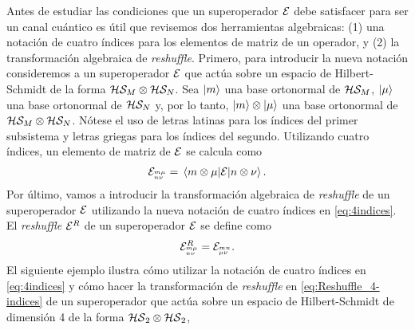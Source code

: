 Antes de estudiar las condiciones que un superoperador $\mathcal{E}$
debe satisfacer para ser un canal cuántico es útil que revisemos
dos herramientas algebraicas: (1) una notación de cuatro índices 
para los elementos de matriz de un operador, y (2) la transformación 
algebraica de \textit{reshuffle}. Primero, para introducir la nueva notación
consideremos a un superoperador $\mathcal{E}$ que actúa sobre un espacio de 
Hilbert-Schmidt de la forma $\mathcal{H}\mathcal{S}_M\otimes\mathcal{H}\mathcal{S}_N$. 
Sea $\ket{m}$ una base ortonormal de $\mathcal{H}\mathcal{S}_M$, $\ket{\mu}$ 
una base ortonormal de $\mathcal{H}\mathcal{S}_N$ y, por lo tanto, 
$\ket{m}\otimes\ket{\mu}$ una base ortonormal de 
$\mathcal{H}\mathcal{S}_M\otimes\mathcal{H}\mathcal{S}_N$.
Nótese el uso de letras latinas para los índices del
primer subsistema y letras griegas para los índices del segundo. 
Utilizando cuatro índices, un elemento de matriz de $\mathcal{E}$ se calcula como
\begin{align}
\E_\ind{m\mu}{n\nu}=\matrixel{m\otimes \mu}{\E}{n\otimes \nu}.
\label{eq:4indices}
\end{align}
Por último, vamos a introducir la transformación algebraica de \textit{reshuffle}
de un superoperador $\mathcal{E}$ utilizando la nueva notación de cuatro índices 
en \eqref{eq:4indices}.
El \textit{reshuffle} $\mathcal{E}^R$ de un superoperador $\mathcal{E}$ se define 
como~\cite{bengtsson_zyczkowski_2017}
\begin{align}
\mathcal{E}^R_{{}^{m\mu}_{n\nu}} = \mathcal{E}_{{}^{mn}_{\mu\nu}}.
\label{eq:Reshuffle_4-indices}
\end{align}
El siguiente ejemplo ilustra cómo utilizar la notación de cuatro 
índices en \eqref{eq:4indices} y cómo hacer la transformación 
de \textit{reshuffle} en \eqref{eq:Reshuffle_4-indices} de un 
superoperador que actúa sobre un espacio de Hilbert-Schmidt de 
dimensión 4 de la forma $\mathcal{HS}_2\otimes \mathcal{HS}_2$,
